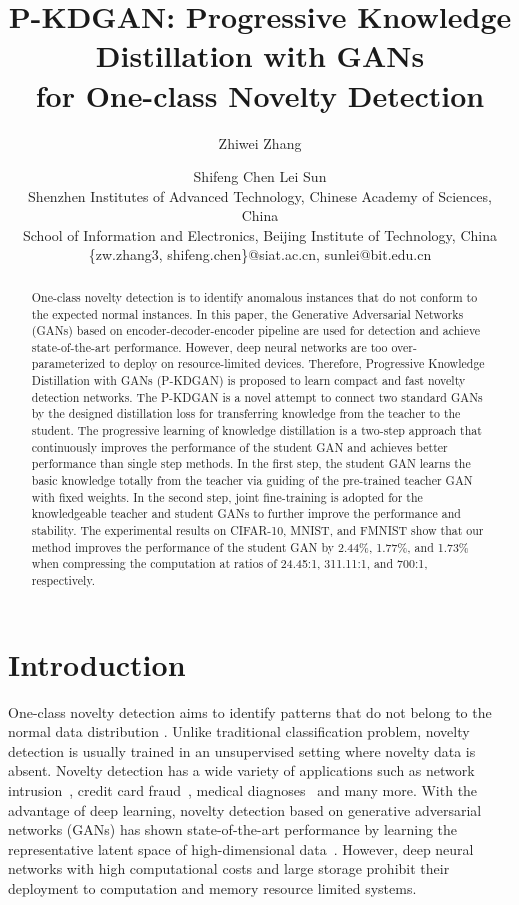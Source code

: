 \documentclass{article}
\title{P-KDGAN: Progressive Knowledge Distillation with GANs \\ for One-class Novelty Detection}
\author{
Zhiwei Zhang\footnotemark[1]\and
Shifeng Chen\footnotemark[2]\And
Lei Sun \\
\affiliations
Shenzhen Institutes of Advanced Technology, Chinese Academy of Sciences, China \\
School of Information and Electronics, Beijing Institute of Technology, China \\
\emails
\{zw.zhang3, shifeng.chen\}@siat.ac.cn,
sunlei@bit.edu.cn
}
\begin{document}
	\maketitle


\begin{abstract}
		One-class novelty detection is to identify anomalous instances that do not conform to the expected normal instances. In this paper, the Generative Adversarial Networks (GANs) based on encoder-decoder-encoder pipeline are used for detection and achieve state-of-the-art performance. However, deep neural networks are too over-parameterized to deploy on resource-limited devices. Therefore, Progressive Knowledge Distillation with GANs (P-KDGAN) is proposed to learn compact and fast novelty detection networks. The P-KDGAN is a novel attempt to connect two standard GANs by the designed distillation loss for transferring knowledge from the teacher to the student. The progressive learning of knowledge distillation is a two-step approach that continuously improves the performance of the student GAN and achieves better performance than single step methods. In the first step, the student GAN learns the basic knowledge totally from the teacher via guiding of the pre-trained teacher GAN with fixed weights. In the second step, joint fine-training is adopted for the knowledgeable teacher and student GANs to further improve the performance and stability. The experimental results on CIFAR-10, MNIST, and FMNIST show that our method improves the performance of the student GAN by 2.44\%, 1.77\%, and 1.73\% when compressing the computation at ratios of 24.45:1, 311.11:1, and 700:1, respectively.
	\end{abstract}
	
	
	\renewcommand{\thefootnote}{\fnsymbol{footnote}}
	

\section{Introduction}
	One-class novelty detection aims to identify patterns that do not belong to the normal data distribution \cite{survey:2009}. Unlike traditional classification problem, novelty detection is usually trained in an unsupervised setting where novelty data is absent. Novelty detection has a wide variety of applications such as network intrusion~\cite{intrusion:2009}, credit card fraud~\cite{fraud:2008}, medical diagnoses~\cite{AnoGAN:2017} and many more. With the advantage of deep learning, novelty detection based on generative adversarial networks (GANs) has shown state-of-the-art performance by learning the representative latent space of high-dimensional data~\cite{AnoGAN:2017,EfficientGAN:2018,OCGAN:2019}. However, deep neural networks with high computational costs and large storage prohibit their deployment to computation and memory resource limited systems.
	
\end{document}
